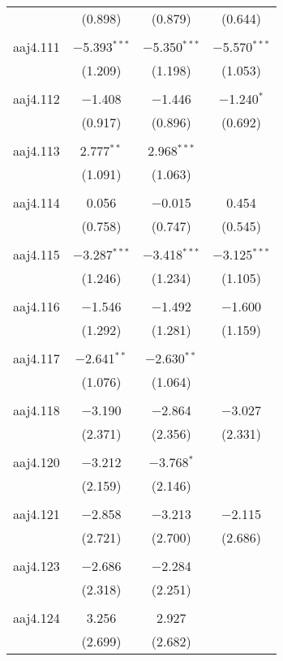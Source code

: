 \begin{table}[!htbp]
\begin{tabular}{@{\extracolsep{5pt}}lccc}
  & (0.898) & (0.879) & (0.644) \\ 
  & & & \\ 
 aaj4.111 & $-$5.393$^{***}$ & $-$5.350$^{***}$ & $-$5.570$^{***}$ \\ 
  & (1.209) & (1.198) & (1.053) \\ 
  & & & \\ 
 aaj4.112 & $-$1.408 & $-$1.446 & $-$1.240$^{*}$ \\ 
  & (0.917) & (0.896) & (0.692) \\ 
  & & & \\ 
 aaj4.113 & 2.777$^{**}$ & 2.968$^{***}$ &  \\ 
  & (1.091) & (1.063) &  \\ 
  & & & \\ 
 aaj4.114 & 0.056 & $-$0.015 & 0.454 \\ 
  & (0.758) & (0.747) & (0.545) \\ 
  & & & \\ 
 aaj4.115 & $-$3.287$^{***}$ & $-$3.418$^{***}$ & $-$3.125$^{***}$ \\ 
  & (1.246) & (1.234) & (1.105) \\ 
  & & & \\ 
 aaj4.116 & $-$1.546 & $-$1.492 & $-$1.600 \\ 
  & (1.292) & (1.281) & (1.159) \\ 
  & & & \\ 
 aaj4.117 & $-$2.641$^{**}$ & $-$2.630$^{**}$ &  \\ 
  & (1.076) & (1.064) &  \\ 
  & & & \\ 
 aaj4.118 & $-$3.190 & $-$2.864 & $-$3.027 \\ 
  & (2.371) & (2.356) & (2.331) \\ 
  & & & \\ 
 aaj4.120 & $-$3.212 & $-$3.768$^{*}$ &  \\ 
  & (2.159) & (2.146) &  \\ 
  & & & \\ 
 aaj4.121 & $-$2.858 & $-$3.213 & $-$2.115 \\ 
  & (2.721) & (2.700) & (2.686) \\ 
  & & & \\ 
 aaj4.123 & $-$2.686 & $-$2.284 &  \\ 
  & (2.318) & (2.251) &  \\ 
  & & & \\ 
 aaj4.124 & 3.256 & 2.927 &  \\ 
  & (2.699) & (2.682) &  \\ 

\end{tabular}
\end{table}
